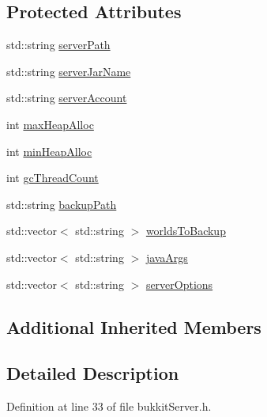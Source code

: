\subsection*{Protected Attributes}
\begin{DoxyCompactItemize}
\item 
std\+::string \hyperlink{class_minecraft_server_service_1_1_bukkit_server_a670b58ed6f157e10f439fd8bd3554081}{server\+Path}
\item 
std\+::string \hyperlink{class_minecraft_server_service_1_1_bukkit_server_a715fdfd8db6b4bfd3f0da088193c4c39}{server\+Jar\+Name}
\item 
std\+::string \hyperlink{class_minecraft_server_service_1_1_bukkit_server_af39cd743eeb5c6daccdbe07de59b6b44}{server\+Account}
\item 
int \hyperlink{class_minecraft_server_service_1_1_bukkit_server_ad8916f8d6fcf0df8922519ba2df42977}{max\+Heap\+Alloc}
\item 
int \hyperlink{class_minecraft_server_service_1_1_bukkit_server_a62ebcb90b98dc041c7c819a8af39c320}{min\+Heap\+Alloc}
\item 
int \hyperlink{class_minecraft_server_service_1_1_bukkit_server_a4ed7ed606547e75eee8b442e54bcf46d}{gc\+Thread\+Count}
\item 
std\+::string \hyperlink{class_minecraft_server_service_1_1_bukkit_server_a85ee657d0612deebbd0d764f85dc70bb}{backup\+Path}
\item 
std\+::vector$<$ std\+::string $>$ \hyperlink{class_minecraft_server_service_1_1_bukkit_server_ad4b403d728a418c62cbe1b2167a5c26c}{worlds\+To\+Backup}
\item 
std\+::vector$<$ std\+::string $>$ \hyperlink{class_minecraft_server_service_1_1_bukkit_server_a757f2ed305f3d06015729e429e104bea}{java\+Args}
\item 
std\+::vector$<$ std\+::string $>$ \hyperlink{class_minecraft_server_service_1_1_bukkit_server_a21e5a43e4dd5fbf5037a6017683b2301}{server\+Options}
\end{DoxyCompactItemize}
\subsection*{Additional Inherited Members}


\subsection{Detailed Description}


Definition at line 33 of file bukkit\+Server.\+h.



